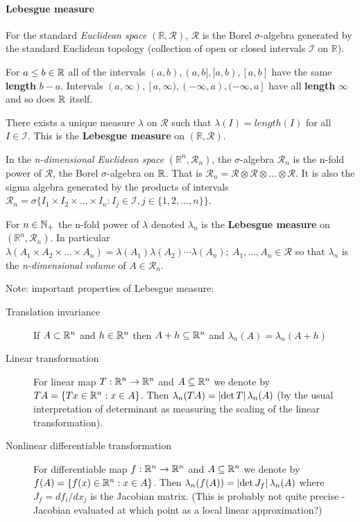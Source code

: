 \paragraph{Lebesgue measure}

\begin{definition}
For the standard \emph{Euclidean space} $(\mathbb{R}, \mathscr{R})$, $\mathscr{R}$ is the Borel $\sigma$-algebra generated by the standard Euclidean topology (collection of open or closed intervals $\mathscr{I}$ on $\mathbb{R}$).

For $a \leq b \in \mathbb{R}$ all of the intervals $(a, b), (a, b], [a, b), [a, b]$ have the same \textbf{length} $b-a$.
Intervals $(a, \infty), [a, \infty), (-\infty, a), (-\infty, a]$ have all \textbf{length} $\infty$ and so does $\mathbb{R}$ itself.

There exists a unique measure $\lambda$ on $\mathscr{R}$ such that $\lambda(I) = length(I)$ for all $I \in \mathscr{I}$.
This is the \textbf{Lebesgue measure} on $(\mathbb{R}, \mathscr{R})$.
\end{definition}

\begin{definition}
In the \emph{n-dimensional Euclidean space} $(\mathbb{R}^n, \mathscr{R}_n)$, the $\sigma$-algebra $\mathscr{R}_n$ is the n-fold power of $\mathscr{R}$, the Borel $\sigma$-algebra on $\mathbb{R}$.
That is $\mathscr{R}_n = \mathscr{R} \otimes \mathscr{R} \otimes \ldots \otimes \mathscr{R}$.
It is also the sigma algebra generated by the products of intervals $\mathscr{R}_n = \sigma\{I_1 \times I_2 \times \ldots \times I_n : I_j \in \mathscr{I}, j \in \{1, 2, \dots, n\} \}$.

For $n \in \mathbb{N}_+$ the n-fold power of $\lambda$ denoted $\lambda_n$ is the \textbf{Lebesgue measure} on $(\mathbb{R}^n, \mathscr{R}_n)$. In particular $\lambda(A_1 \times A_2 \times \ldots \times A_n) = \lambda(A_1) \lambda(A_2) \cdots \lambda(A_n); \ A_1, \ldots, A_n \in \mathscr{R}$ so that $\lambda_n$ is the \emph{n-dimensional volume} of $A \in \mathscr{R}_n$.
\end{definition}

Note: important properties of Lebesgue measure:
\begin{description}
\item[Translation invariance] If $A \subset \mathbb{R}^n$ and $h \in \mathbb{R}^n$ then $A + h \subseteq \mathbb{R}^n$ and $\lambda_n(A) = \lambda_n(A + h)$
\item[Linear transformation] For linear map $T : \mathbb{R}^n \to \mathbb{R}^n$ and $A \subseteq \mathbb{R}^n$ we denote by $TA = \{Tx \in \mathbb{R}^n : x \in A\}$. Then $\lambda_n(TA) = \lvert \det T \rvert \, \lambda_n(A)$ (by the usual interpretation of determinant as measuring the scaling of the linear transformation).
\item[Nonlinear differentiable transformation] For differentiable map $f : \mathbb{R}^n \to \mathbb{R}^n$ and $A \subseteq \mathbb{R}^n$ we denote by $f(A) = \{f(x) \in \mathbb{R}^n : x \in A\}$. Then $\lambda_n(f(A)) = \lvert \det J_f \rvert \, \lambda_n(A)$ where $J_f = d f_i / d x_j$ is the Jacobian matrix. (This is probably not quite precise - Jacobian evaluated at which point as a local linear approximation?)
\end{description}


